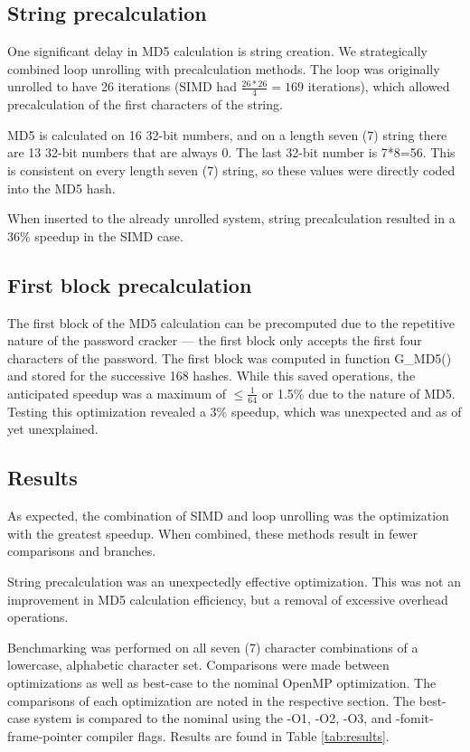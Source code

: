 	\subsection{String precalculation}
		One significant delay in MD5 calculation is string creation. We strategically combined loop unrolling with precalculation methods. The loop was originally unrolled to have 26 iterations (SIMD had $\frac{26*26}{4}=169$ iterations), which allowed precalculation of the first characters of the string. 

		MD5 is calculated on 16 32-bit numbers, and on a length seven (7) string there are 13 32-bit numbers that are always 0. The last 32-bit number is 7*8=56. This is consistent on every length seven (7) string, so these values were directly coded into the MD5 hash.

		When inserted to the already unrolled system, string precalculation resulted in a 36\% speedup in the SIMD case. 

	\subsection{First block precalculation}
		The first block of the MD5 calculation can be precomputed due to the repetitive nature of the password cracker --- the first block only accepts the first four characters of the password. The first block was computed in function G\_MD5() and stored for the successive 168 hashes. While this saved operations, the anticipated speedup was a maximum of $\le\frac{1}{64}$ or 1.5\% due to the nature of MD5. Testing this optimization revealed a 3\% speedup, which was unexpected and as of yet unexplained.  

	\subsection{Results}
		As expected, the combination of SIMD and loop unrolling was the optimization with the greatest speedup. When combined, these methods result in fewer comparisons and branches. 

		String precalculation was an unexpectedly effective optimization. This was not an improvement in MD5 calculation efficiency, but a removal of excessive overhead operations.  

		Benchmarking was performed on all seven (7) character combinations of a lowercase, alphabetic character set. Comparisons were made between optimizations as well as best-case to the nominal OpenMP optimization. The comparisons of each optimization are noted in the respective section. The best-case system is compared to the nominal using the -O1, -O2, -O3, and -fomit-frame-pointer compiler flags. Results are found in Table \ref{tab:results}.

